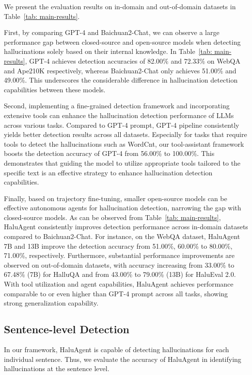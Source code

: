 We present the evaluation results on in-domain and out-of-domain datasets in Table~\ref{tab: main-results}.

First, by comparing GPT-4 and Baichuan2-Chat, we can observe a large performance gap between closed-source and open-source models when detecting hallucinations solely based on their internal knowledge. In Table~\ref{tab: main-results}, 
GPT-4 achieves detection accuracies of 82.00\% and 72.33\% on WebQA and Ape210K respectively, whereas Baichuan2-Chat only achieves 51.00\% and 49.00\%. 
This underscores the considerable difference in hallucination detection capabilities between these models.

Second, implementing a fine-grained detection framework and incorporating extensive tools can enhance the hallucination detection performance of LLMs across various tasks. Compared to GPT-4 prompt, GPT-4 pipeline consistently yields better detection results across all datasets. 
Especially for tasks that require tools to detect the hallucinations such as WordCnt, our tool-assistant framework boosts the detection accuracy of GPT-4 from 56.00\% to 100.00\%. This demonstrates that guiding the model to utilize appropriate tools tailored to the specific text is an effective strategy to enhance hallucination detection capabilities.

Finally, based on trajectory fine-tuning, smaller open-source models can be effective autonomous agents for hallucination detection, narrowing the gap with closed-source models. As can be observed from Table~\ref{tab: main-results}, HaluAgent consistently improves detection performance across in-domain datasets compared to Baichuan2-Chat. 
For instance, on the WebQA dataset, HaluAgent 7B and 13B improve the detection accuracy from 51.00\%, 60.00\% to 80.00\%, 71.00\%, respectively.
Furthermore, substantial performance improvements are observed on out-of-domain datasets, with accuracy increasing from 33.00\% to 67.48\% (7B) for HalluQA and from 43.00\% to 79.00\% (13B) for HaluEval 2.0.  
With tool utilization and agent capabilities, HaluAgent achieves performance comparable to or even higher than GPT-4 prompt across all tasks, showing strong generalization capability.



\subsection{Sentence-level Detection}

In our framework, HaluAgent is capable of detecting hallucinations for each individual sentence. Thus, we evaluate the accuracy of HaluAgent in identifying hallucinations at the sentence level. 

